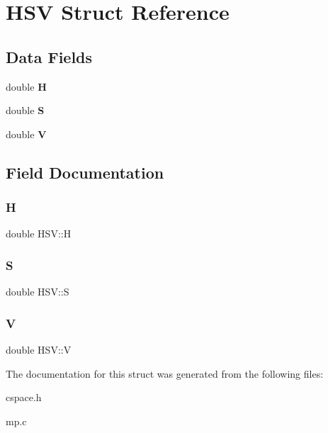 \hypertarget{struct_h_s_v}{}\section{H\+SV Struct Reference}
\label{struct_h_s_v}
\subsection*{Data Fields}
\begin{DoxyCompactItemize}
\item 
\mbox{\label{struct_h_s_v_aa5298b83b6f6ad2da2f2921c3e3202e7}} 
double {\bfseries H}
\item 
\mbox{\label{struct_h_s_v_a246df45210c6b7c61056158d1596676d}} 
double {\bfseries S}
\item 
\mbox{\label{struct_h_s_v_aade636e6ce581e93de5374f0e5d77d7c}} 
double {\bfseries V}
\end{DoxyCompactItemize}


\subsection{Field Documentation}
\mbox{\label{struct_h_s_v_aa5298b83b6f6ad2da2f2921c3e3202e7}} 
\subsubsection{\texorpdfstring{H}{H}}
{\footnotesize\ttfamily double H\+S\+V\+::H}

\mbox{\label{struct_h_s_v_a246df45210c6b7c61056158d1596676d}} 
\subsubsection{\texorpdfstring{S}{S}}
{\footnotesize\ttfamily double H\+S\+V\+::S}

\mbox{\label{struct_h_s_v_aade636e6ce581e93de5374f0e5d77d7c}} 
\subsubsection{\texorpdfstring{V}{V}}
{\footnotesize\ttfamily double H\+S\+V\+::V}



The documentation for this struct was generated from the following files\+:\begin{DoxyCompactItemize}
\item 
cspace.\+h\item 
mp.\+c\end{DoxyCompactItemize}
